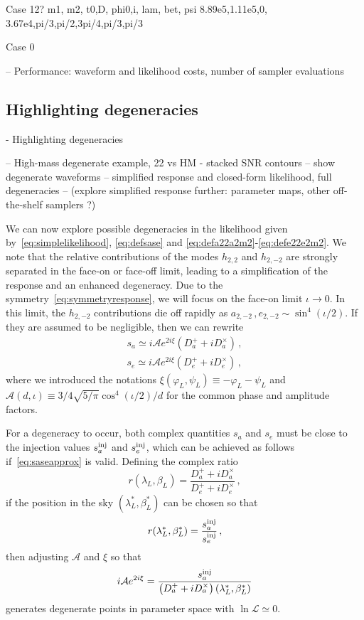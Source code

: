 \documentclass[aps,showpacs,twocolumn,prd,superscriptaddress,nofootinbib]{revtex4}
\newcommand{\be}{\begin{equation}}
\newcommand{\ee}{\end{equation}}
\newcommand{\bsub}{\begin{subequations}}
\newcommand{\esub}{\end{subequations}}
\newcommand\calL{{\mathcal{L}}}
\newcommand\calA{{\mathcal{A}}}
\newcommand\betaL{{\beta_{L}}}
\newcommand\lambdaL{{\lambda_{L}}}
\newcommand\varphiL{{\varphi_{L}}}
\newcommand\psiL{{\psi_{L}}}
\begin{document}
Case 12?
m1,    m2,    t0,D,     phi0,i,   lam,  bet, psi
8.89e5,1.11e5,0, 3.67e4,pi/3,pi/2,3pi/4,pi/3,pi/3

Case 0

-- Performance: waveform and likelihood costs, number of sampler evaluations


\subsection{Highlighting degeneracies}
\label{sec:degen}

- Highlighting degeneracies

-- High-mass degenerate example, 22 vs HM - stacked SNR contours
-- show degenerate waveforms
-- simplified response and closed-form likelihood, full degeneracies
-- (explore simplified response further: parameter maps, other off-the-shelf samplers ?)

We can now explore possible degeneracies in the likelihood given by~\eqref{eq:simplelikelihood}, \eqref{eq:defsase} and \eqref{eq:defa22a2m2}-\eqref{eq:defe22e2m2}. We note that the relative contributions of the modes $h_{2,2}$ and $h_{2,-2}$ are strongly separated in the face-on or face-off limit, leading to a simplification of the response and an enhanced degeneracy. Due to the symmetry~\eqref{eq:symmetryresponse}, we will focus on the face-on limit $\iota \rightarrow 0$. In this limit, the $h_{2,-2}$ contributions die off rapidly as $a_{2,-2}\,, e_{2,-2} \sim \sin^{4} (\iota/2)$. If they are assumed to be negligible, then we can rewrite
\bsub\label{eq:saseapprox}
\begin{align}
	s_{a} \simeq i\calA e^{2 i \xi} \left( D_{a}^{+} + i D_{a}^{\times} \right) \,, \\
	s_{e} \simeq i\calA e^{2 i \xi} \left( D_{e}^{+} + i D_{e}^{\times} \right) \,,
\end{align}
\esub
where we introduced the notations $\xi (\varphiL, \psiL) \equiv -\varphiL - \psiL$ and $\calA(d, \iota) \equiv 3/4\sqrt{5/\pi}\cos^{4}(\iota/2)/d $ for the common phase and amplitude factors.

For a degeneracy to occur, both complex quantities $s_{a}$ and $s_{e}$ must be close to the injection values $s_{a}^{\rm inj}$ and $s_{e}^{\rm inj}$, which can be achieved as follows if~\eqref{eq:saseapprox} is valid. Defining the complex ratio
\be\label{eq:defr}
	r(\lambdaL, \betaL) = \frac{D_{a}^{+} + i D_{a}^{\times}}{D_{e}^{+} + i D_{e}^{\times} } \,,
\ee
if the position in the sky $(\lambda_{L}^{*}, \beta_{L}^{*})$ can be chosen so that
\be\label{eq:rcondition}
	r(\lambda_{L}^{*}, \beta_{L}^{*}) = \frac{s_{a}^{\rm inj}}{s_{e}^{\rm inj}} \,,
\ee
then adjusting $\calA$ and $\xi$ so that
\be
	i\calA e^{2 i \xi} = \frac{s_{a}^{\rm inj}}{\left( D_{a}^{+} + i D_{a}^{\times} \right)(\lambda_{L}^{*}, \beta_{L}^{*})}
\ee
generates degenerate points in parameter space with $\ln \calL \simeq 0$.
\end{document}
